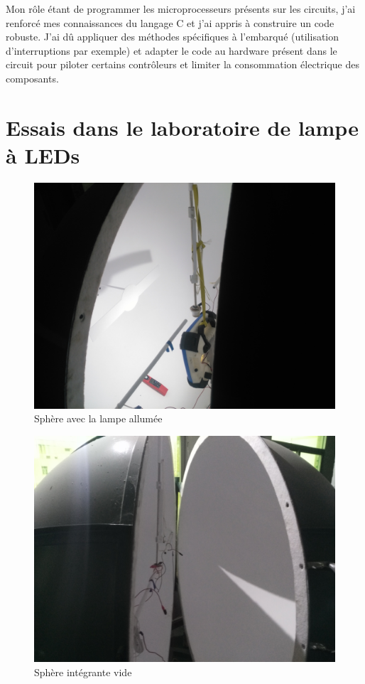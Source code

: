 \documentclass[a4paper, 12pt, sffamily]{report}
\begin{document}
Mon rôle étant de programmer les microprocesseurs présents sur les circuits, j'ai renforcé mes connaissances du langage C et j'ai appris à construire un code robuste. J'ai dû appliquer des méthodes spécifiques à l'embarqué (utilisation d'interruptions par exemple) et adapter le code au hardware présent dans le circuit pour piloter certains contrôleurs et limiter la consommation électrique des composants. 



\appendix

\chapter{Essais dans le laboratoire de lampe à LEDs}
\label{cha:labo_pictures}

\begin{figure}[H]
\centering
\includegraphics[scale=0.08]{figures/photos/tests_worklamp/sphere/sphere_allumee.jpg}
\caption{Sphère avec la lampe allumée} 
\label{fig:lamp_on}
\end{figure}

\begin{figure}[H]
\centering
\includegraphics[scale=0.08]{figures/photos/tests_worklamp/sphere/spehre_vide.jpg}
\caption{Sphère intégrante vide}
\label{fig:empty_sphere}
\end{figure}
\end{document}
